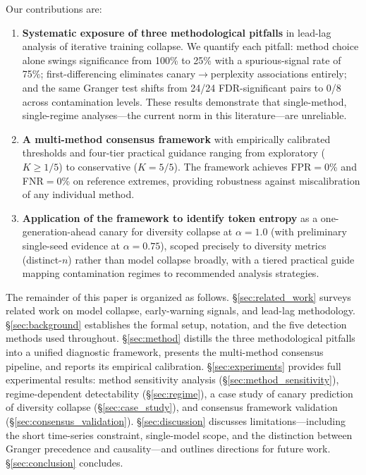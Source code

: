 Our contributions are:
\begin{enumerate}
    \item \textbf{Systematic exposure of three methodological pitfalls} in lead-lag analysis of iterative training collapse.
    We quantify each pitfall: method choice alone swings significance from 100\% to 25\% with a spurious-signal rate of 75\%; first-differencing eliminates canary$\to$perplexity associations entirely; and the same Granger test shifts from 24/24 FDR-significant pairs to 0/8 across contamination levels.
    These results demonstrate that single-method, single-regime analyses---the current norm in this literature---are unreliable.

    \item \textbf{A multi-method consensus framework} with empirically calibrated thresholds and four-tier practical guidance ranging from exploratory ($K{\geq}1/5$) to conservative ($K{=}5/5$).
    The framework achieves FPR${=}$0\% and FNR${=}$0\% on reference extremes, providing robustness against miscalibration of any individual method.

    \item \textbf{Application of the framework to identify token entropy} as a one-generation-ahead canary for diversity collapse at $\alpha{=}1.0$ (with preliminary single-seed evidence at $\alpha{=}0.75$), scoped precisely to diversity metrics (distinct-$n$) rather than model collapse broadly, with a tiered practical guide mapping contamination regimes to recommended analysis strategies.
\end{enumerate}

The remainder of this paper is organized as follows.
\S\ref{sec:related_work} surveys related work on model collapse, early-warning signals, and lead-lag methodology.
\S\ref{sec:background} establishes the formal setup, notation, and the five detection methods used throughout.
\S\ref{sec:method} distills the three methodological pitfalls into a unified diagnostic framework, presents the multi-method consensus pipeline, and reports its empirical calibration.
\S\ref{sec:experiments} provides full experimental results: method sensitivity analysis (\S\ref{sec:method_sensitivity}), regime-dependent detectability (\S\ref{sec:regime}), a case study of canary prediction of diversity collapse (\S\ref{sec:case_study}), and consensus framework validation (\S\ref{sec:consensus_validation}).
\S\ref{sec:discussion} discusses limitations---including the short time-series constraint, single-model scope, and the distinction between Granger precedence and causality---and outlines directions for future work.
\S\ref{sec:conclusion} concludes.